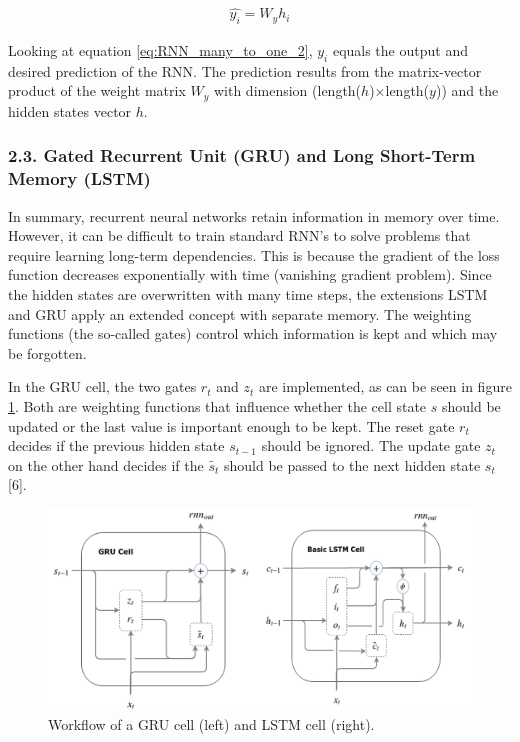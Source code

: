 \documentclass[
]{article}
\begin{document}
\begin{align} \label{eq:RNN_many_to_one_2}
  \hat{y_{i}} = W_{y}h_{i}
\end{align}

Looking at equation \ref{eq:RNN_many_to_one_2}, \(y_{i}\) equals the
output and desired prediction of the RNN. The prediction results from
the matrix-vector product of the weight matrix \(W_{y}\) with dimension
(length(\(h\))\(\times\)length(\(y\))) and the hidden states vector
\(h\).

\newpage

\hypertarget{gated-recurrent-unit-gru-and-long-short-term-memory-lstm}{%
\subsubsection{2.3. Gated Recurrent Unit (GRU) and Long Short-Term
Memory
(LSTM)}\label{gated-recurrent-unit-gru-and-long-short-term-memory-lstm}}

In summary, recurrent neural networks retain information in memory over
time. However, it can be difficult to train standard RNN's to solve
problems that require learning long-term dependencies. This is because
the gradient of the loss function decreases exponentially with time
(vanishing gradient problem). Since the hidden states are overwritten
with many time steps, the extensions LSTM and GRU apply an extended
concept with separate memory. The weighting functions (the so-called
gates) control which information is kept and which may be forgotten.

In the GRU cell, the two gates \(r_t\) and \(z_t\) are implemented, as
can be seen in figure \ref{fig:GRU_LSTM}. Both are weighting functions
that influence whether the cell state \(s\) should be updated or the
last value is important enough to be kept. The reset gate \(r_t\)
decides if the previous hidden state \(s_{t-1}\) should be ignored. The
update gate \(z_t\) on the other hand decides if the \(\tilde{s_t}\)
should be passed to the next hidden state \(s_t\) {[}6{]}.

\begin{figure}

{\centering \includegraphics[width=0.9\linewidth]{images/GRU_LSTM} 

}

\caption{Workflow of a GRU cell (left) and LSTM cell (right).}\label{fig:GRU_LSTM}
\end{figure}
\end{document}
